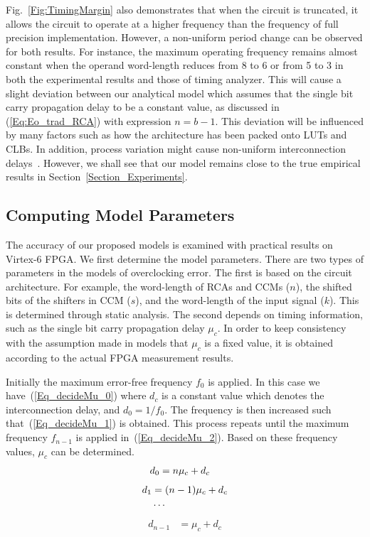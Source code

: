 \documentclass[prodmode,acmtrets]{acmsmall} %
\begin{document}
Fig.~\ref{Fig:TimingMargin} also demonstrates that when the circuit is truncated, it allows the circuit to operate at a higher frequency than the frequency of full precision implementation. However, a non-uniform period change can be observed for both results. For instance, the maximum operating frequency remains almost constant when the operand word-length reduces from 8 to 6 or from 5 to 3 in both the experimental results and those of timing analyzer. This will cause a slight deviation between our analytical model which assumes that the single bit carry propagation delay to be a constant value, as discussed in (\ref{Eq:Eo_trad_RCA}) with expression $n=b-1$. This deviation will be influenced by many factors such as how the architecture has been packed onto LUTs and CLBs. In addition, process variation might cause non-uniform interconnection delays~\cite{FPGAPV}. However, we shall see that our model remains close to the true empirical results in Section~\ref{Section_Experiments}.

\subsection{Computing Model Parameters}
The accuracy of our proposed models is examined with practical results on Virtex-6 FPGA. We first determine the model parameters. There are two types of parameters in the models of overclocking error. The first is based on the circuit architecture. For example, the word-length of RCAs and CCMs ($n$), the shifted bits of the shifters in CCM ($s$), and the word-length of the input signal ($k$). This is determined through static analysis. The second depends on timing information, such as the single bit carry propagation delay $\mu_c$. In order to keep consistency with the assumption made in models that $\mu_c$ is a fixed value, it is obtained according to the actual FPGA measurement results.

Initially the maximum error-free frequency $f_0$ is applied. In this case we have~(\ref{Eq_decideMu_0}) where $d_c$ is a constant value which denotes the interconnection delay, and $d_0=1/f_0$. The frequency is then increased such that~(\ref{Eq_decideMu_1}) is obtained. This process repeats until the maximum frequency $f_{n-1}$ is applied in~(\ref{Eq_decideMu_2}). Based on these frequency values, $\mu_c$ can be determined.
%
\begin{eqnarray}\label{Eq_decideMu_0}
  d_0 &= n\mu_c+d_c
  \vspace{-13ex}
\end{eqnarray}
\vspace{-4ex}
\begin{align}\label{Eq_decideMu_1}
  d_1 &= (n-1)\mu_c+d_c    \\
  &\cdots               \notag
  \vspace{-3ex}
\end{align}
\vspace{-4ex}
\begin{eqnarray}\label{Eq_decideMu_2}
  {d_{n-1}} &= \mu_c+d_c
\end{eqnarray}
\end{document}
